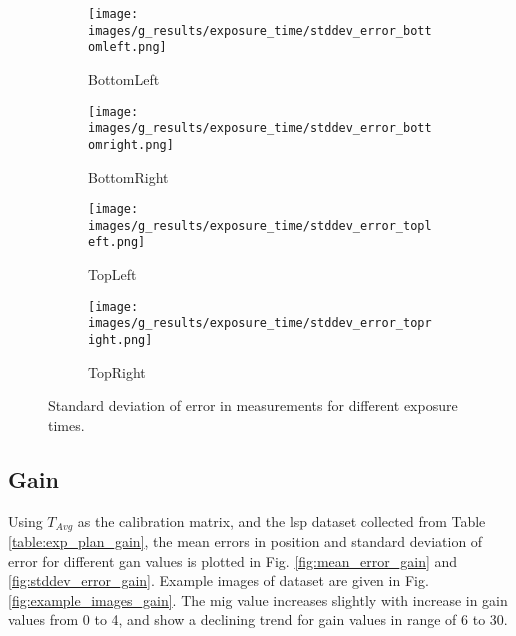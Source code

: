 \begin{figure}[ht]
    \centering
    \begin{subfigure}[b]{0.46\textwidth}
        \centering
        \texttt{[image: images/g\_results/exposure\_time/stddev\_error\_bottomleft.png]}
        \caption{\textsf{BottomLeft}}
    \end{subfigure}
    \hspace{1cm}
    \begin{subfigure}[b]{0.46\textwidth}
        \centering
        \texttt{[image: images/g\_results/exposure\_time/stddev\_error\_bottomright.png]}
        \caption{\textsf{BottomRight}}
    \end{subfigure}

    \vspace{5mm}
    
    \begin{subfigure}[b]{0.46\textwidth}
        \centering
        \texttt{[image: images/g\_results/exposure\_time/stddev\_error\_topleft.png]}
        \caption{\textsf{TopLeft}}
    \end{subfigure}
    \hspace{1cm}
    \begin{subfigure}[b]{0.46\textwidth}
        \centering
        \texttt{[image: images/g\_results/exposure\_time/stddev\_error\_topright.png]}
        \caption{\textsf{TopRight}}
    \end{subfigure}

    \caption{Standard deviation of error in measurements for different exposure times.}
    \label{fig:stddev_error_exposure_time}
\end{figure}

\clearpage

\subsection*{Gain}
Using $T_{Avg}$ as the calibration matrix, and the \gls{lsp} dataset collected from Table \ref{table:exp_plan_gain}, the mean errors in position and standard deviation of error for different gan values is plotted in Fig. \ref{fig:mean_error_gain} and \ref{fig:stddev_error_gain}. Example images of dataset are given in Fig. \ref{fig:example_images_gain}. The \gls{mig} value increases slightly with increase in gain values from 0 to 4, and show a declining trend for gain values in range of 6 to 30.  


